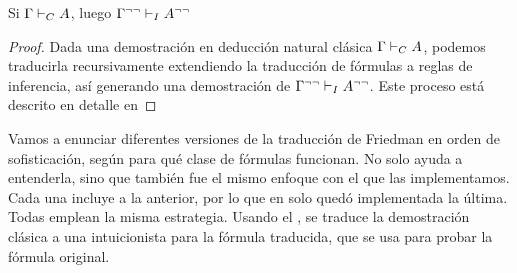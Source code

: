 \begin{theorem}
    \label{fri:thm:dneg-trans-classic-int}
    Si $\Gamma \vdash_C A$, luego $\Gamma^{\neg\neg} \vdash_I A^{\neg\neg}$
\end{theorem}
\begin{proof}
    Dada una demostración en deducción natural clásica $\Gamma \vdash_C A$, podemos traducirla recursivamente extendiendo la traducción de fórmulas a reglas de inferencia, así generando una demostración de $\Gamma^{\neg\neg} \vdash_I A^{\neg\neg}$.
    Este proceso está descrito en detalle en 
\end{proof}

Vamos a enunciar diferentes versiones de la traducción de Friedman en orden de sofisticación, según para qué clase de fórmulas funcionan. No solo ayuda a entenderla, sino que también fue el mismo enfoque con el que las implementamos. Cada una incluye a la anterior, por lo que en \ppaTool{} solo quedó implementada la última. Todas emplean la misma estrategia. Usando el , se traduce la demostración clásica a una intuicionista para la fórmula traducida, que se usa para probar la fórmula original.


